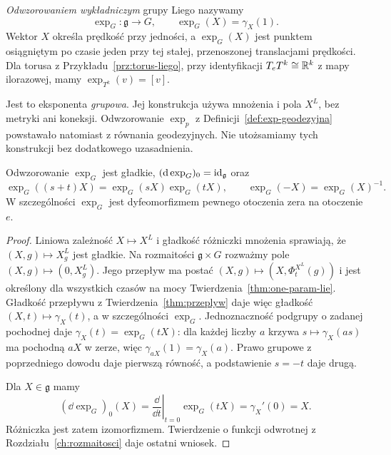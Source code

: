 \begin{definicja}
\label{def:lie-exp}
\emph{Odwzorowaniem wykładniczym} grupy Liego nazywamy
\[
 \exp_G:\mathfrak g\longrightarrow G,\qquad
 \exp_G(X)=\gamma_X(1).
\]
Wektor $X$ określa prędkość przy jedności, a $\exp_G(X)$
jest punktem osiągniętym po czasie jeden przy tej stałej,
przenoszonej translacjami prędkości. Dla torusa z
Przykładu~\ref{prz:torus-liego}, przy identyfikacji
$T_eT^k\cong\mathbb{R}^k$ z mapy ilorazowej, mamy
$\exp_{T^k}(v)=[v]$.
\end{definicja}

Jest to eksponenta \emph{grupowa}. Jej konstrukcja używa
mnożenia i pola $X^L$, bez metryki ani koneksji.
Odwzorowanie $\exp_p$ z Definicji~\ref{def:exp-geodezyjna}
powstawało natomiast z równania geodezyjnych.
Nie utożsamiamy tych konstrukcji bez dodatkowego uzasadnienia.

\begin{stwierdzenie}
\label{prop:lie-exp-properties}
Odwzorowanie $\exp_G$ jest gładkie,
$(\mathrm d\exp_G)_0=\mathrm{id}_{\mathfrak g}$ oraz
\[
 \exp_G((s+t)X)=\exp_G(sX)\exp_G(tX),\qquad
 \exp_G(-X)=\exp_G(X)^{-1}.
\]
W szczególności $\exp_G$ jest dyfeomorfizmem pewnego
otoczenia zera na otoczenie $e$.
\end{stwierdzenie}
\begin{proof}
Liniowa zależność $X\mapsto X^L$ i gładkość różniczki
mnożenia sprawiają, że $(X,g)\mapsto X^L_g$ jest
gładkie. Na rozmaitości $\mathfrak g\times G$ rozważmy
pole $(X,g)\mapsto(0,X^L_g)$. Jego przepływ ma postać
$(X,g)\mapsto(X,\Phi_t^{X^L}(g))$ i jest określony
dla wszystkich czasów na mocy
Twierdzenia~\ref{thm:one-param-lie}. Gładkość przepływu
z Twierdzenia~\ref{thm:przeplyw} daje więc gładkość
$(X,t)\mapsto\gamma_X(t)$, a w szczególności $\exp_G$.
Jednoznaczność podgrupy o zadanej pochodnej
daje $\gamma_X(t)=\exp_G(tX)$: dla każdej liczby $a$
krzywa $s\mapsto\gamma_X(as)$ ma pochodną $aX$ w zerze,
więc $\gamma_{aX}(1)=\gamma_X(a)$.
Prawo grupowe z poprzedniego dowodu daje pierwszą równość,
a podstawienie $s=-t$ daje drugą.

Dla $X\in\mathfrak g$ mamy
\[
 (\dd\exp_G)_0(X)
 =\left.\frac{\dd}{\dd t}\right|_{t=0}\exp_G(tX)
 =\gamma_X'(0)=X.
\]
Różniczka jest zatem izomorfizmem. Twierdzenie o funkcji
odwrotnej z Rozdziału~\ref{ch:rozmaitosci} daje ostatni wniosek.
\end{proof}

